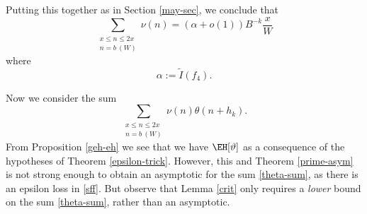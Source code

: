 Putting this together as in Section \ref{may-sec}, we conclude that
$$ \sum_{\substack{x \leq n \leq 2x\\ n = b\ (W)}} \nu(n) = (\alpha + o(1)) B^{-k} \frac{x}{W}$$
where 
$$ \alpha := \tilde I(f_4).$$

Now we consider the sum
\begin{equation}\label{theta-sum}
 \sum_{\substack{x \leq n \leq 2x\\ n = b\ (W)}} \nu(n) \theta(n+h_k).
\end{equation}
From Proposition \ref{geh-eh} we see that we have $\EH[\vartheta]$ as a consequence of the hypotheses of Theorem \ref{epsilon-trick}.  However, this and Theorem \ref{prime-asym} is not strong enough to obtain an asymptotic for the sum \eqref{theta-sum}, as there is an epsilon loss in \eqref{sff}.  But observe that Lemma \ref{crit} only requires a \emph{lower} bound on the sum \eqref{theta-sum}, rather than an asymptotic. 

